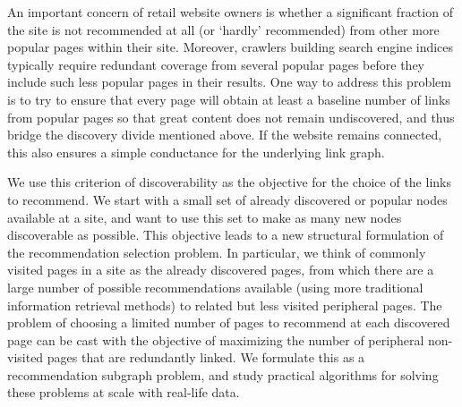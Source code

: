 An important concern of retail website owners is whether a significant fraction of the site is not recommended at all (or `hardly' recommended) from other more popular pages within their site. Moreover, crawlers building search engine indices typically require redundant coverage from several popular pages before they include such less popular pages in their results.
One way to address this
problem is to try to ensure that every page will obtain at least a baseline number of links from popular pages so that great content does not remain undiscovered, and thus bridge the discovery divide mentioned above. If the website
remains connected, this also ensures a simple conductance for the underlying link graph. \vs


We use this criterion of discoverability as the objective for the choice of the links to recommend. 
We start with a small set of already discovered or popular nodes available at a site, and want to use this set to make as many new nodes discoverable as possible. This objective leads to a new structural formulation of the recommendation selection problem. In particular, we think of commonly visited pages in a site as the already discovered pages, from which there are a large number of possible recommendations available (using more traditional information retrieval methods) to related but less visited peripheral pages. The problem of choosing a limited number of pages to recommend at each discovered page can be cast with the objective of maximizing the number of peripheral non-visited pages that are redundantly linked. We formulate this as a recommendation subgraph problem, and study practical algorithms for solving these problems at scale with real-life data.\vs

